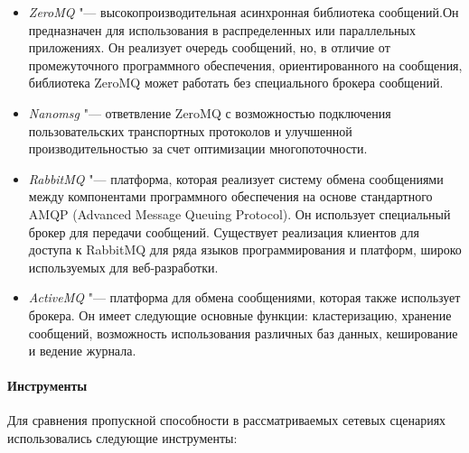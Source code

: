 \begin{itemize}
	\item \textit{ZeroMQ} "--- высокопроизводительная асинхронная библиотека сообщений.Он предназначен для использования в распределенных или параллельных приложениях. Он реализует очередь сообщений, но, в отличие от промежуточного программного обеспечения, ориентированного на сообщения, библиотека ZeroMQ может работать без специального брокера сообщений.
	\item \textit{Nanomsg} "--- ответвление ZeroMQ с возможностью подключения пользовательских транспортных протоколов и улучшенной производительностью за счет оптимизации многопоточности.
	\item \textit{RabbitMQ} "--- платформа, которая реализует систему обмена сообщениями между компонентами программного обеспечения на основе стандартного AMQP (Advanced Message Queuing Protocol). Он использует специальный брокер для передачи сообщений.
	Существует реализация клиентов для доступа к RabbitMQ для ряда языков программирования и платформ, широко используемых для веб-разработки.
	\item \textit{ActiveMQ} "--- платформа для обмена сообщениями, которая также использует брокера. Он имеет следующие основные функции: кластеризацию, хранение сообщений, возможность использования различных баз данных, кеширование и ведение журнала.
\end{itemize}

\paragraph{Инструменты}

Для сравнения пропускной способности в рассматриваемых сетевых сценариях использовались следующие инструменты:

